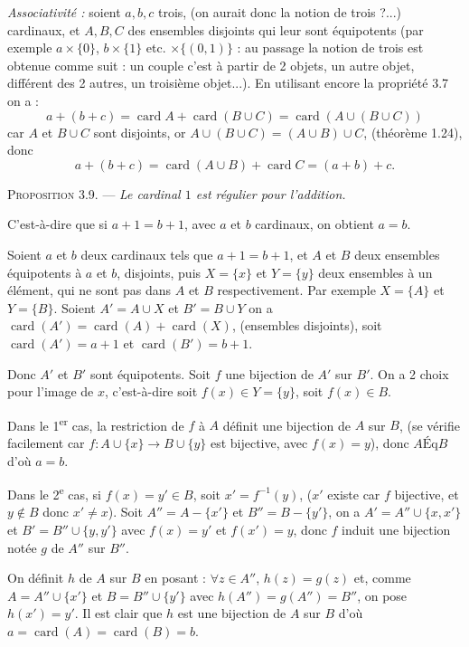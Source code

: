 \emph{Associativité :} soient $a,b,c$ trois, (on aurait donc la notion de trois ?...) cardinaux, et $A,B,C$ des ensembles disjoints qui leur sont équipotents (par exemple $a\times\{0\}$, $b\times\{1\}$ etc. $\times\{(0,1)\}$ : au passage la notion de trois est obtenue comme suit : un couple c'est à partir de 2 objets, un autre objet, différent des 2 autres, un troisième objet...). En utilisant encore la propriété 3.7 on a :
\[
a+(b+c)=\operatorname{card}A+\operatorname{card}(B\cup C)=\operatorname{card}(A\cup(B\cup C))
\]
car $A$ et $B\cup C$ sont disjoints, or $A\cup(B\cup C)=(A\cup B)\cup C$, (théorème 1.24), donc
\[
a+(b+c)=\operatorname{card}(A\cup B)+\operatorname{card}C=(a+b)+c.
\]
\bookend

\medskip\noindent\textsc{Proposition 3.9.} --- \emph{Le cardinal $1$ est régulier pour l'addition.}

C'est-à-dire que si $a+1=b+1$, avec $a$ et $b$ cardinaux, on obtient $a=b$.

Soient $a$ et $b$ deux cardinaux tels que $a+1=b+1$, et $A$ et $B$ deux ensembles équipotents à $a$ et $b$, disjoints, puis $X=\{x\}$ et $Y=\{y\}$ deux ensembles à un élément, qui ne sont pas dans $A$ et $B$ respectivement. Par exemple $X=\{A\}$ et $Y=\{B\}$. Soient $A'=A\cup X$ et $B'=B\cup Y$ on a $\operatorname{card}(A')=\operatorname{card}(A)+\operatorname{card}(X)$, (ensembles disjoints), soit $\operatorname{card}(A')=a+1$ et $\operatorname{card}(B')=b+1$.

Donc $A'$ et $B'$ sont équipotents. Soit $f$ une bijection de $A'$ sur $B'$. On a 2 choix pour l'image de $x$, c'est-à-dire soit $f(x)\in Y=\{y\}$, soit $f(x)\in B$.

Dans le 1\textsuperscript{er} cas, la restriction de $f$ à $A$ définit une bijection de $A$ sur $B$, (se vérifie facilement car $f:A\cup\{x\}\longrightarrow B\cup\{y\}$ est bijective, avec $f(x)=y$), donc $A\mathrel{\mathrm{Éq}}B$ d'où $a=b$.

Dans le 2\textsuperscript{e} cas, si $f(x)=y'\in B$, soit $x'=f^{-1}(y)$, ($x'$ existe car $f$ bijective, et $y\notin B$ donc $x'\ne x$). Soit $A''=A-\{x'\}$ et $B''=B-\{y'\}$, on a $A'=A''\cup\{x,x'\}$ et $B'=B''\cup\{y,y'\}$ avec $f(x)=y'$ et $f(x')=y$, donc $f$ induit une bijection notée $g$ de $A''$ sur $B''$.

On définit $h$ de $A$ sur $B$ en posant : $\forall z\in A''$, $h(z)=g(z)$ et, comme $A=A''\cup\{x'\}$ et $B=B''\cup\{y'\}$ avec $h(A'')=g(A'')=B''$, on pose $h(x')=y'$. Il est clair que $h$ est une bijection de $A$ sur $B$ d'où $a=\operatorname{card}(A)=\operatorname{card}(B)=b$. \bookend

